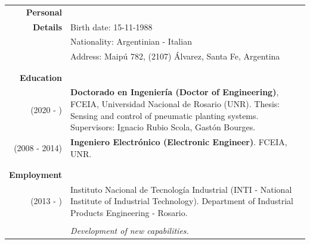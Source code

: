 \documentclass[a4paper,10pt, sans]{article}
\begin{document}
\vspace{0.5cm}
\large
\begin{table}[H]
  \begin{tabularx}{\textwidth}{r X}
    \textbf{Personal} & {} \\ [1ex]
    \textbf{Details} & Birth date: 15-11-1988 \\ [1ex]
      {} & Nationality: Argentinian - Italian \\ [1ex]
      {} & Address: Maipú 782, (2107) Álvarez, Santa Fe, Argentina \\ \\ \hline \\

    \textbf{Education} & {} \\ [1ex]
       (2020 - ) & \textbf{Doctorado en Ingeniería (Doctor of Engineering)}, FCEIA, Universidad Nacional de Rosario (UNR). Thesis: Sensing and control of pneumatic planting systems. Supervisors: Ignacio Rubio Scola, Gastón Bourges.\\ [1ex]
       (2008 - 2014) & \textbf{Ingeniero Electrónico (Electronic Engineer)}. FCEIA, UNR.\\ \\ \hline \\


    
    
    \textbf{Employment} & {}\\ [1ex]
      (2013 - ) & Instituto Nacional de Tecnología Industrial (INTI - National Institute of Industrial Technology). Department of Industrial Products Engineering - Rosario.\\ \\
            
        {} & \hspace{2cm} \textit{Development of new capabilities.} \\ [1ex]
        

\end{tabularx}
\end{table}
\end{document}
